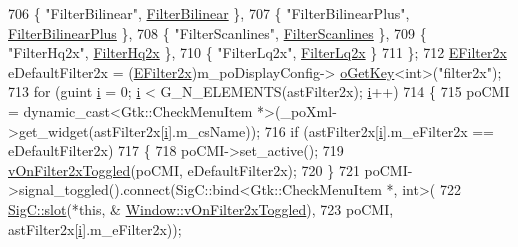 \begin{DoxyCode}
{{706     \{ \textcolor{stringliteral}{"FilterBilinear"},      \mbox{\hyperlink{class_v_b_a_a1683020d7324daf3bda627d0d3658e3eaa6907f9a75b6629321ace6341cc6cb74}{FilterBilinear}}     \},
707     \{ \textcolor{stringliteral}{"FilterBilinearPlus"},  \mbox{\hyperlink{class_v_b_a_a1683020d7324daf3bda627d0d3658e3ea62423b14544f4e8407c3782cbda73ea5}{FilterBilinearPlus}} \},
708     \{ \textcolor{stringliteral}{"FilterScanlines"},     \mbox{\hyperlink{class_v_b_a_a1683020d7324daf3bda627d0d3658e3ea5be32f285bd9186fbfc2b7c8e3fb88e6}{FilterScanlines}}    \},
709     \{ \textcolor{stringliteral}{"FilterHq2x"},          \mbox{\hyperlink{class_v_b_a_a1683020d7324daf3bda627d0d3658e3eab7675fc6a8daa2bd735d45c64cd48461}{FilterHq2x}}         \},
710     \{ \textcolor{stringliteral}{"FilterLq2x"},          \mbox{\hyperlink{class_v_b_a_a1683020d7324daf3bda627d0d3658e3eaf61b7eb046be3f55c0999b35e3cb2170}{FilterLq2x}}         \}
711   \};
712   \mbox{\hyperlink{class_v_b_a_a1683020d7324daf3bda627d0d3658e3e}{EFilter2x}} eDefaultFilter2x = (\mbox{\hyperlink{class_v_b_a_a1683020d7324daf3bda627d0d3658e3e}{EFilter2x}})m\_poDisplayConfig->
      \mbox{\hyperlink{class_v_b_a_1_1_config_1_1_section_ab169d7aae4e9dde91418ba1668e3ad39}{oGetKey}}<\textcolor{keywordtype}{int}>(\textcolor{stringliteral}{"filter2x"});
713   \textcolor{keywordflow}{for} (guint \mbox{\hyperlink{expr-lex_8cpp_acb559820d9ca11295b4500f179ef6392}{i}} = 0; \mbox{\hyperlink{expr-lex_8cpp_acb559820d9ca11295b4500f179ef6392}{i}} < G\_N\_ELEMENTS(astFilter2x); \mbox{\hyperlink{expr-lex_8cpp_acb559820d9ca11295b4500f179ef6392}{i}}++)
714   \{
715     poCMI = \textcolor{keyword}{dynamic\_cast<}Gtk::CheckMenuItem *\textcolor{keyword}{>}(\_poXml->get\_widget(astFilter2x[\mbox{\hyperlink{expr-lex_8cpp_acb559820d9ca11295b4500f179ef6392}{i}}].m\_csName));
716     \textcolor{keywordflow}{if} (astFilter2x[\mbox{\hyperlink{expr-lex_8cpp_acb559820d9ca11295b4500f179ef6392}{i}}].m\_eFilter2x == eDefaultFilter2x)
717     \{
718       poCMI->set\_active();
719       \mbox{\hyperlink{class_v_b_a_1_1_window_ad73fe13a9e4c8b40fbe6f0726210cc5c}{vOnFilter2xToggled}}(poCMI, eDefaultFilter2x);
720     \}
721     poCMI->signal\_toggled().connect(SigC::bind<Gtk::CheckMenuItem *, int>(
722                                       \mbox{\hyperlink{namespace_sig_c_a92e4f19202b77e78ac1db05f5a62f6b6}{SigC::slot}}(*\textcolor{keyword}{this}, &
      \mbox{\hyperlink{class_v_b_a_1_1_window_ad73fe13a9e4c8b40fbe6f0726210cc5c}{Window::vOnFilter2xToggled}}),
723                                       poCMI, astFilter2x[\mbox{\hyperlink{expr-lex_8cpp_acb559820d9ca11295b4500f179ef6392}{i}}].m\_eFilter2x));
}}
\end{DoxyCode}
